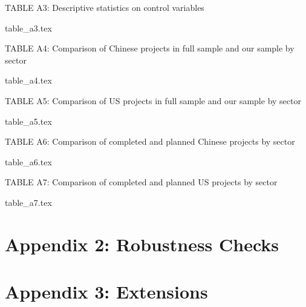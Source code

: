 \documentclass[9pt]{article}
\begin{document}
\setlength{\tabcolsep}{5pt}
\begin{table}[H]
\caption{TABLE A3: Descriptive statistics on control variables}
\label{reg}
\centering
{table_a3.tex}
\end{table}

\setlength{\tabcolsep}{5pt}
\begin{table}[H]
\caption{TABLE A4: Comparison of Chinese projects in full sample and our sample by sector}
\label{reg}
\centering
{table_a4.tex}
\end{table}

\setlength{\tabcolsep}{5pt}
\begin{table}[H]
\caption{TABLE A5: Comparison of US projects in full sample and our sample by sector}
\label{reg}
\centering
{table_a5.tex}
\end{table}

\setlength{\tabcolsep}{5pt}
\begin{table}[H]
\caption{TABLE A6: Comparison of completed and planned Chinese projects by sector}
\label{reg}
\centering
{table_a6.tex}
\end{table}

\setlength{\tabcolsep}{5pt}
\begin{table}[H]
\caption{TABLE A7: Comparison of completed and planned US projects by sector}
\label{reg}
\centering
{table_a7.tex}
\end{table}

\newpage
\section{Appendix 2: Robustness Checks}

\newpage
\section{Appendix 3: Extensions}
\end{document}
